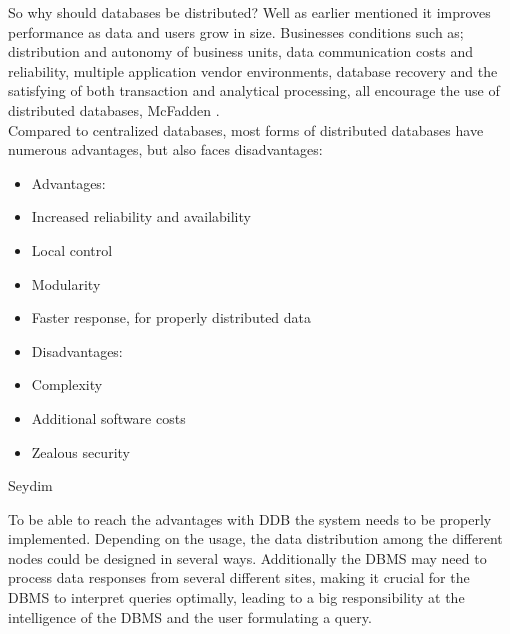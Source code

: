 \documentclass{cslthse-msc}
\begin{document}
So why should databases be distributed? Well as earlier mentioned it improves performance as data and users grow in size. Businesses conditions such as; distribution and autonomy of business units, data communication costs and reliability, multiple application vendor environments, database recovery and the satisfying of both transaction and analytical processing, all encourage the use of distributed databases, McFadden \cite{DDBMS}.\\ Compared to centralized databases, most forms of distributed databases have numerous advantages, but also faces disadvantages:     

\begin{center}
\noindent\begin{minipage}[t]{0.5\linewidth}
    \begin{itemize}
    \item[] Advantages:
    \item{Increased reliability and availability}
    \item{Local control}
    \item{Modularity}
    \item{Faster response, for properly distributed data}
    \end{itemize}
    \end{minipage}%
    \begin{minipage}[t]{0.4\linewidth}
    \begin{itemize}
    \item[] Disadvantages: 
    \item{Complexity}
    \item{Additional software costs}
    \item{Zealous security}
    \end{itemize}
\end{minipage}
\end{center}
\begin{flushright}
Seydim \cite{advdisDDBMS}
\end{flushright}
To be able to reach the advantages with DDB the system needs to be properly implemented. Depending on the usage, the data distribution among the different nodes could be designed in several ways. Additionally the DBMS may need to process data responses from several different sites, making it crucial for the DBMS to interpret queries optimally, leading to a big responsibility at the intelligence of the DBMS and the user formulating a query. 
\end{document}
